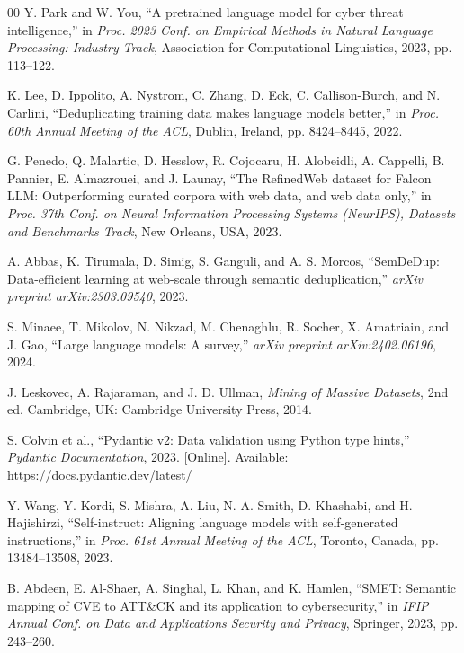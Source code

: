 \documentclass[conference]{IEEEtran}
\begin{document}
\begin{thebibliography}{00}
Y. Park and W. You,
``A pretrained language model for cyber threat intelligence,''
in \textit{Proc. 2023 Conf. on Empirical Methods in Natural Language
Processing: Industry Track},
Association for Computational Linguistics, 2023, pp. 113--122.

K. Lee, D. Ippolito, A. Nystrom, C. Zhang, D. Eck,
C. Callison-Burch, and N. Carlini,
``Deduplicating training data makes language models better,''
in \textit{Proc. 60th Annual Meeting of the ACL},
Dublin, Ireland, pp. 8424--8445, 2022.

G. Penedo, Q. Malartic, D. Hesslow, R. Cojocaru, H. Alobeidli,
A. Cappelli, B. Pannier, E. Almazrouei, and J. Launay,
``The RefinedWeb dataset for Falcon LLM: Outperforming curated
corpora with web data, and web data only,''
in \textit{Proc. 37th Conf. on Neural Information Processing Systems
(NeurIPS), Datasets and Benchmarks Track},
New Orleans, USA, 2023.

A. Abbas, K. Tirumala, D. Simig, S. Ganguli, and A. S. Morcos,
``SemDeDup: Data-efficient learning at web-scale through semantic
deduplication,''
\textit{arXiv preprint arXiv:2303.09540}, 2023.

S. Minaee, T. Mikolov, N. Nikzad, M. Chenaghlu, R. Socher,
X. Amatriain, and J. Gao,
``Large language models: A survey,''
\textit{arXiv preprint arXiv:2402.06196}, 2024.

J. Leskovec, A. Rajaraman, and J. D. Ullman,
\textit{Mining of Massive Datasets}, 2nd ed.
Cambridge, UK: Cambridge University Press, 2014.

S. Colvin et al.,
``Pydantic v2: Data validation using Python type hints,''
\textit{Pydantic Documentation}, 2023.
[Online]. Available: \url{https://docs.pydantic.dev/latest/}

Y. Wang, Y. Kordi, S. Mishra, A. Liu, N. A. Smith, D. Khashabi,
and H. Hajishirzi,
``Self-instruct: Aligning language models with self-generated
instructions,''
in \textit{Proc. 61st Annual Meeting of the ACL},
Toronto, Canada, pp. 13484--13508, 2023.

B. Abdeen, E. Al-Shaer, A. Singhal, L. Khan, and K. Hamlen,
``SMET: Semantic mapping of CVE to ATT\&CK and its application
to cybersecurity,''
in \textit{IFIP Annual Conf. on Data and Applications Security
and Privacy},
Springer, 2023, pp. 243--260.


\end{thebibliography}
\end{document}
